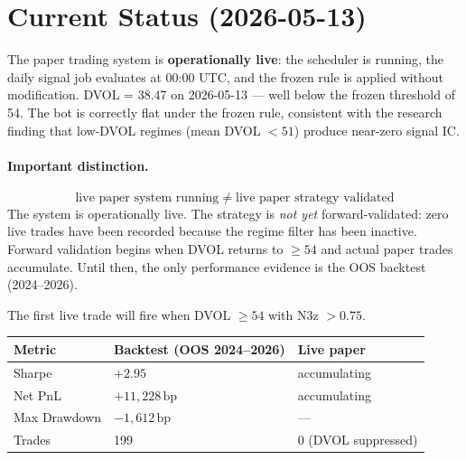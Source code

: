 \documentclass[11pt,a4paper]{article}
\begin{document}
\section{Current Status (2026-05-13)}

The paper trading system is \textbf{operationally live}: the scheduler is running, the daily signal job evaluates at 00:00 UTC, and the frozen rule is applied without modification. DVOL = 38.47 on 2026-05-13 --- well below the frozen threshold of 54. The bot is correctly flat under the frozen rule, consistent with the research finding that low-DVOL regimes (mean DVOL $< 51$) produce near-zero signal IC.

\paragraph{Important distinction.}
\[
\text{live paper system running} \;\neq\; \text{live paper strategy validated}
\]
The system is operationally live. The strategy is \emph{not yet} forward-validated: zero live trades have been recorded because the regime filter has been inactive. Forward validation begins when DVOL returns to $\geq 54$ and actual paper trades accumulate. Until then, the only performance evidence is the OOS backtest (2024--2026).

The first live trade will fire when DVOL $\geq 54$ with N3z $> 0.75$.

\begin{center}
\begin{tabular}{@{}lll@{}}
\toprule
\textbf{Metric} & \textbf{Backtest (OOS 2024--2026)} & \textbf{Live paper} \\
\midrule
Sharpe & $+2.95$ & accumulating \\
Net PnL & $+11{,}228\,\text{bp}$ & accumulating \\
Max Drawdown & $-1{,}612\,\text{bp}$ & --- \\
Trades & 199 & 0 (DVOL suppressed) \\
\bottomrule
\end{tabular}
\end{center}
\end{document}
